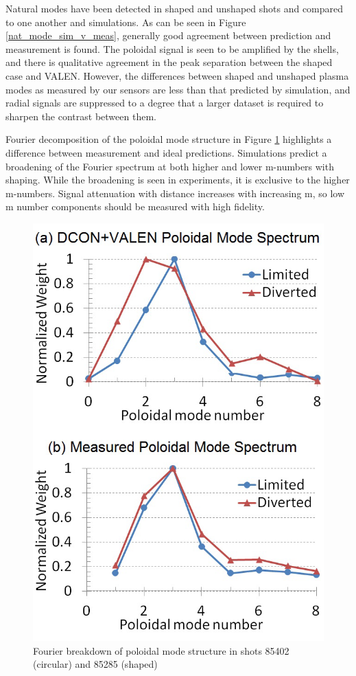 \documentclass[aps,prl,twocolumn,superscriptaddress,groupedaddress]{revtex4}  %
\begin{document}
	Natural modes have been detected in shaped and unshaped shots and compared to one another and simulations.  As can be seen in Figure \ref{nat_mode_sim_v_meas}, generally good agreement between prediction and measurement is found.  The poloidal signal is seen to be amplified by the shells, and there is qualitative agreement in the peak separation between the shaped case and VALEN.  %
However, the differences between shaped and unshaped plasma modes as measured by our sensors are less than that predicted by simulation, and radial signals are suppressed to a degree that a larger dataset is required to sharpen the contrast between them.\par
	Fourier decomposition of the poloidal mode structure in Figure \ref{mike_mode_structure} highlights a difference between measurement and ideal predictions.  Simulations predict a broadening of the Fourier spectrum at both higher and lower m-numbers with shaping.  While the broadening is seen in experiments, it is exclusive to the higher m-numbers.  Signal attenuation with distance increases with increasing m, so low m number components should be measured with high fidelity.\par
	\begin{figure}[htb]
	\centering
\includegraphics[scale=.5]{../Plots/fig2_mode_spectrum_REV2.png}\caption{Fourier breakdown of poloidal mode structure in shots 85402 (circular) and 85285 (shaped)}
	\label{mike_mode_structure}
	\end{figure}
\end{document}
